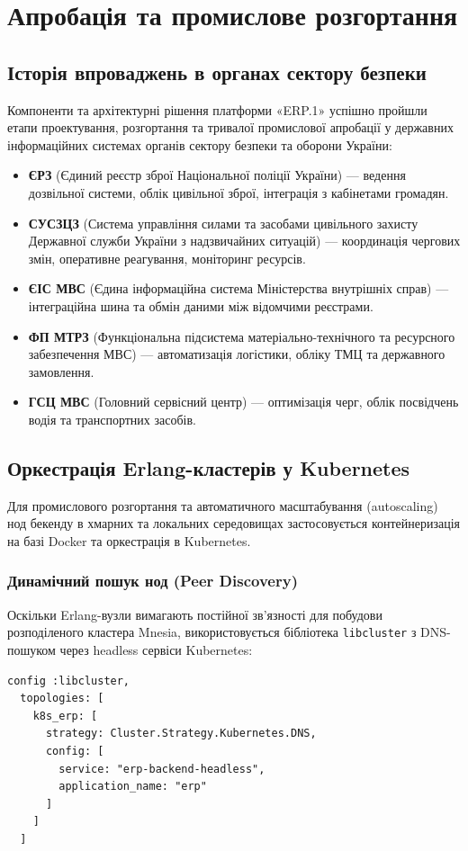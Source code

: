 \chapter{Апробація та промислове розгортання}

\section{Історія впроваджень в органах сектору безпеки}
Компоненти та архітектурні рішення платформи «ERP.1» успішно пройшли етапи проектування, розгортання та тривалої промислової апробації у державних інформаційних системах органів сектору безпеки та оборони України:
\begin{itemize}
    \item \textbf{ЄРЗ} (Єдиний реєстр зброї Національної поліції України) --- ведення дозвільної системи, облік цивільної зброї, інтеграція з кабінетами громадян.
    \item \textbf{СУСЗЦЗ} (Система управління силами та засобами цивільного захисту Державної служби України з надзвичайних ситуацій) --- координація чергових змін, оперативне реагування, моніторинг ресурсів.
    \item \textbf{ЄІС МВС} (Єдина інформаційна система Міністерства внутрішніх справ) --- інтеграційна шина та обмін даними між відомчими реєстрами.
    \item \textbf{ФП МТРЗ} (Функціональна підсистема матеріально-технічного та ресурсного забезпечення МВС) --- автоматизація логістики, обліку ТМЦ та державного замовлення.
    \item \textbf{ГСЦ МВС} (Головний сервісний центр) --- оптимізація черг, облік посвідчень водія та транспортних засобів.
\end{itemize}

\section{Оркестрація Erlang-кластерів у Kubernetes}
 
Для промислового розгортання та автоматичного масштабування (autoscaling) нод бекенду в хмарних та локальних середовищах застосовується контейнеризація на базі Docker та оркестрація в Kubernetes.

\subsection{Динамічний пошук нод (Peer Discovery)}
Оскільки Erlang-вузли вимагають постійної зв'язності для побудови розподіленого кластера Mnesia, використовується бібліотека \texttt{libcluster} з DNS-пошуком через headless сервіси Kubernetes:
\begin{lstlisting}
config :libcluster,
  topologies: [
    k8s_erp: [
      strategy: Cluster.Strategy.Kubernetes.DNS,
      config: [
        service: "erp-backend-headless",
        application_name: "erp"
      ]
    ]
  ]
\end{lstlisting}

